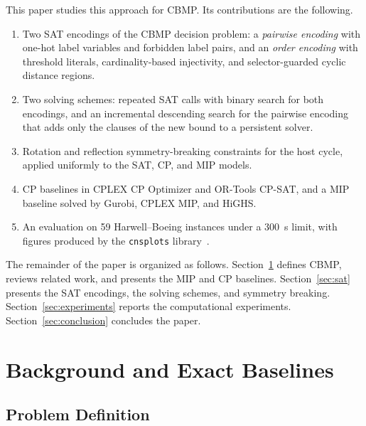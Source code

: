\documentclass[a4paper,fleqn]{cas-sc}
\begin{document}
This paper studies this approach for CBMP. Its contributions are the following.
\begin{enumerate}
    \item Two SAT encodings of the CBMP decision problem: a \emph{pairwise encoding} with one-hot label variables and forbidden label pairs, and an \emph{order encoding} with threshold literals, cardinality-based injectivity, and selector-guarded cyclic distance regions.
    \item Two solving schemes: repeated SAT calls with binary search for both encodings, and an incremental descending search for the pairwise encoding that adds only the clauses of the new bound to a persistent solver.
    \item Rotation and reflection symmetry-breaking constraints for the host cycle, applied uniformly to the SAT, CP, and MIP models.
    \item CP baselines in CPLEX CP Optimizer and OR-Tools CP-SAT, and a MIP baseline solved by Gurobi, CPLEX MIP, and HiGHS.
    \item An evaluation on 59 Harwell--Boeing instances under a 300~s limit, with figures produced by the \texttt{cnsplots} library~\citep{cnsplots}.
\end{enumerate}

The remainder of the paper is organized as follows. Section~\ref{sec:formulations} defines CBMP, reviews related work, and presents the MIP and CP baselines. Section~\ref{sec:sat} presents the SAT encodings, the solving schemes, and symmetry breaking. Section~\ref{sec:experiments} reports the computational experiments. Section~\ref{sec:conclusion} concludes the paper.

\section{Background and Exact Baselines}
\label{sec:formulations}

\subsection{Problem Definition}
\end{document}
